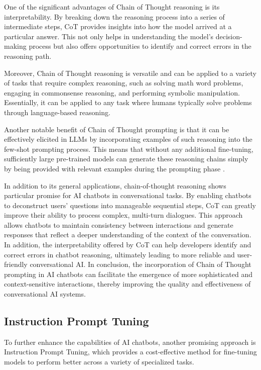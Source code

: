 One of the significant advantages of Chain of Thought reasoning is its interpretability. By breaking down the reasoning process into a series of intermediate steps, CoT provides insights into how the model arrived at a particular answer. This not only helps in understanding the model’s decision-making process but also offers opportunities to identify and correct errors in the reasoning path.

Moreover, Chain of Thought reasoning is versatile and can be applied to a variety of tasks that require complex reasoning, such as solving math word problems, engaging in commonsense reasoning, and performing symbolic manipulation. Essentially, it can be applied to any task where humans typically solve problems through language-based reasoning.

Another notable benefit of Chain of Thought prompting is that it can be effectively elicited in LLMs by incorporating examples of such reasoning into the few-shot prompting process. This means that without any additional fine-tuning, sufficiently large pre-trained models can generate these reasoning chains simply by being provided with relevant examples during the prompting phase \cite{wei2022chain}.

In addition to its general applications, chain-of-thought reasoning shows particular promise for AI chatbots in conversational tasks. By enabling chatbots to deconstruct users' questions into manageable sequential steps, CoT can greatly improve their ability to process complex, multi-turn dialogues. This approach allows chatbots to maintain consistency between interactions and generate responses that reflect a deeper understanding of the context of the conversation. In addition, the interpretability offered by CoT can help developers identify and correct errors in chatbot reasoning, ultimately leading to more reliable and user-friendly conversational AI. In conclusion, the incorporation of Chain of Thought prompting in AI chatbots can facilitate the emergence of more sophisticated and context-sensitive interactions, thereby improving the quality and effectiveness of conversational AI systems.

\subsection{Instruction Prompt Tuning}

To further enhance the capabilities of AI chatbots, another promising approach is Instruction Prompt Tuning, which provides a cost-effective method for fine-tuning models to perform better across a variety of specialized tasks.

